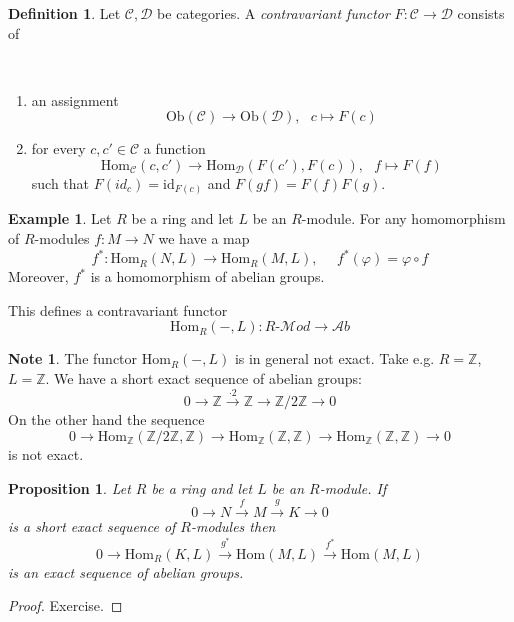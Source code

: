 \documentclass[12pt, letterpaper, oneside]{article}
\theoremstyle{plain}
\newtheorem{proposition}[theorem]{Proposition}
\theoremstyle{definition}
\newtheorem{definition}[theorem]{Definition}
\newtheorem{example}[theorem]{Example}
\newtheorem{note}[theorem]{Note}
\newcommand{\lra}{\longrightarrow}
\newcommand{\Z}{{\mathbb Z}}
\newcommand{\Hom}{\mathrm{Hom}}
\newcommand{\Ob}{\mathrm{Ob}}
\newcommand{\id}{\mathrm{id}}
\newcommand{\CC}{{\mathcal C}}
\newcommand{\DD}{{\mathcal D}}
\newcommand{\Ab}{{\mathcal Ab}}
\newcommand{\Mod}{{\mathcal Mod}}
\newcommand{\benu}{\begin{enumerate}}
\newcommand{\eenu}{\end{enumerate}}
\newcommand{\vs}{\vskip 5mm}
\begin{document}
\vs\vs


\begin{definition}
Let $\CC, \DD$ be categories. A \emph{contravariant functor} $F\colon \CC \to \DD$ consists of

\vskip -13mm

\ 
\benu
\item an assignment 
$$\Ob(\CC) \to \Ob(\DD), \ \ \ c\mapsto F(c)$$
\item for every $c, c'\in \CC$ a function
$$\Hom_{\CC}(c, c') \to \Hom_{\DD}(F(c'), F(c)), \ \ \  f \mapsto F(f)$$
such that $F(id_{c}) = \id_{F(c)}$ and $F(gf) = F(f)F(g)$.
\eenu

\end{definition}


\vs\vs


\begin{example}

Let $R$ be a ring and let $L$ be an $R$-module. For any homomorphism of $R$-modules 
$f\colon M \to N$ we have a map
$$f^{\ast}\colon \Hom_{R}(N, L) \lra \Hom_{R}(M, L), \ \ \ \ \ \ f^{\ast}(\varphi) = \varphi\circ f$$  
Moreover, $f^{\ast}$ is a homomorphism of abelian groups. 

This defines a contravariant functor 
$$\Hom_{R}(-, L)\colon \text{$R$-$\Mod$} \lra \Ab$$
\end{example}

\vs\vs

\begin{note}
The functor $\Hom_{R}(-, L)$ is in general not exact.  Take e.g. $R= \Z$, $L= \Z$. We have a short 
exact sequence of abelian groups:
$$0\to \Z \overset{\cdot 2}{\lra} \Z \lra \Z/2\Z \to 0 $$
On the other hand the sequence 
$$0\to \Hom_{\Z}(\Z/2\Z, \Z) \lra \Hom_{\Z}(\Z,\Z) \lra \Hom_{\Z}(\Z,\Z) \to 0 $$
is not exact. 
\end{note}


\vs\vs

\begin{proposition}
\label{PROP_HOM-LRIGHTEXACT}
Let $R$ be a ring and let $L$ be an $R$-module. If 
$$ 0 \lra N \overset{f}{\lra} M \overset{g}{\lra} K \lra 0$$
is a short exact sequence of $R$-modules then 
$$ 0 \lra \Hom_{R}(K, L) \overset{g^{\ast}}{\lra}  \Hom(M, L) \overset{f^{\ast}}{\lra}  \Hom(M, L)$$
is an exact sequence of abelian groups.
\end{proposition}


\vs

\begin{proof}
Exercise. 
\end{proof}
\end{document}
